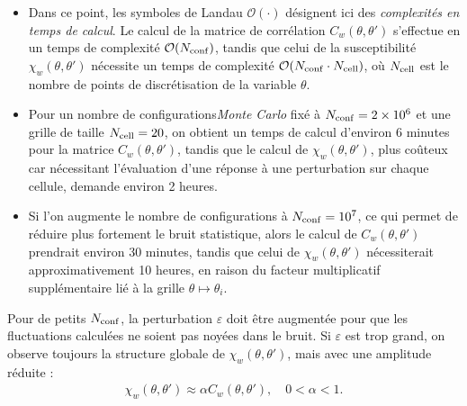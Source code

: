 \begin{itemize}[label = $\bullet$]
    \item Dans ce point, les symboles de Landau \(\mathcal{O}(\cdot)\) désignent ici des \emph{complexités en temps de calcul}. 
    Le calcul de la matrice de corrélation \(C_w(\theta, \theta')\) s'effectue en un temps 
    de complexité \(\mathcal{O}(N_{\rm conf})\), tandis que celui de la susceptibilité 
    \(\chi_w(\theta, \theta')\) nécessite un temps de complexité 
    \(\mathcal{O}(N_{\rm conf} \cdot N_{\rm cell})\), où \(N_{\rm cell}\) est le nombre de points 
    de discrétisation de la variable \(\theta\).

    \item Pour un nombre de configurations\emph{Monte Carlo} fixé à 
    \(N_{\rm conf} = 2 \times 10^6\) et une grille de taille \(N_{\rm cell} = 20\), 
    on obtient un temps de calcul d'environ 6 minutes pour la matrice \(C_w(\theta,\theta')\), 
    tandis que le calcul de \(\chi_w(\theta,\theta')\), plus coûteux car nécessitant 
    l'évaluation d'une réponse à une perturbation sur chaque cellule, demande environ 2 heures.

    \item Si l'on augmente le nombre de configurations à 
    \(N_{\rm conf} = 10^7\), ce qui permet de réduire plus fortement le bruit statistique, 
    alors le calcul de \(C_w(\theta,\theta')\) prendrait environ 30 minutes, 
    tandis que celui de \(\chi_w(\theta,\theta')\) nécessiterait approximativement 10 heures, 
    en raison du facteur multiplicatif supplémentaire lié à la grille 
    \(\theta \mapsto \theta_i\).
\end{itemize}


\medskip

Pour de petits \(N_{\rm conf}\), la perturbation \(\varepsilon\) doit être augmentée pour que les fluctuations calculées ne soient pas noyées dans le bruit. Si \(\varepsilon\) est trop grand, on observe toujours la structure globale de \(\chi_w(\theta, \theta')\), mais avec une amplitude réduite :
\begin{eqnarray*}
	\chi_w(\theta, \theta') \approx \alpha C_w(\theta, \theta'), \quad 0 < \alpha < 1.
\end{eqnarray*}

